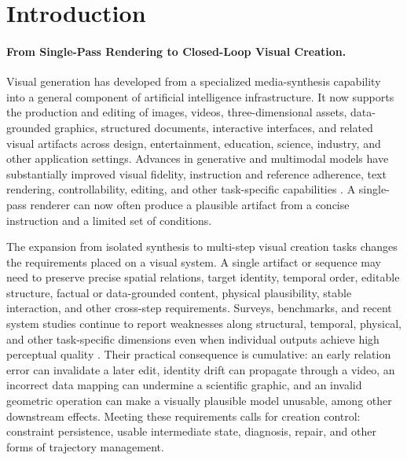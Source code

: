 \section{Introduction}
\label{sec:introduction}

\paragraph{From Single-Pass Rendering to Closed-Loop Visual Creation.}
Visual generation has developed from a specialized media-synthesis capability into a general component of artificial intelligence infrastructure. It now supports the production and editing of images, videos, three-dimensional assets, data-grounded graphics, structured documents, interactive interfaces, and related visual artifacts across design, entertainment, education, science, industry, and other application settings. Advances in generative and multimodal models have substantially improved visual fidelity, instruction and reference adherence, text rendering, controllability, editing, and other task-specific capabilities \cite{he2024llms,yang2025textimage,wang2025imageediting,yin2025spatiotemporal}. A single-pass renderer can now often produce a plausible artifact from a concise instruction and a limited set of conditions.


The expansion from isolated synthesis to multi-step visual creation tasks changes the requirements placed on a visual system. A single artifact or sequence may need to preserve precise spatial relations, target identity, temporal order, editable structure, factual or data-grounded content, physical plausibility, stable interaction, and other cross-step requirements. Surveys, benchmarks, and recent system studies continue to report weaknesses along structural, temporal, physical, and other task-specific dimensions even when individual outputs achieve high perceptual quality \cite{wu2026visualgeneration,yin2025spatiotemporal,avg250925229,feng2026newton}. Their practical consequence is cumulative: an early relation error can invalidate a later edit, identity drift can propagate through a video, an incorrect data mapping can undermine a scientific graphic, and an invalid geometric operation can make a visually plausible model unusable, among other downstream effects. Meeting these requirements calls for creation control: constraint persistence, usable intermediate state, diagnosis, repair, and other forms of trajectory management.

